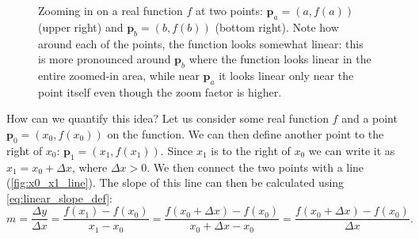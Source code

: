\begin{figure}
  \caption{Zooming in on a real function $f$ at two points: $\bm{p}_{a}=\left(a,f(a)\right)$ (upper right) and $\bm{p}_{b}=\left(b,f(b)\right)$ (bottom right). Note how around each of the points, the function looks somewhat linear: this is more pronounced around $\bm{p}_{b}$ where the function looks linear in the entire zoomed-in area, while near $\bm{p}_{a}$ it looks linear only near the point itself even though the zoom factor is higher.}
  \label{fig:zoom_in}
\end{figure}

How can we quantify this idea? Let us consider some real function $f$ and a point $\bm{p}_{0} = \left(x_{0},f\left(x_{0}\right)\right)$ on the function. We can then define another point to the right of $x_{0}$: $\bm{p}_{1}=\left(x_{1},f\left(x_{1}\right)\right)$. Since $x_{1}$ is to the right of $x_{0}$ we can write it as $x_{1}=x_{0}+\Delta x$, where $\Delta x>0$. We then connect the two points with a line (\autoref{fig:x0_x1_line}). The slope of this line can then be calculated using \autoref{eq:linear_slope_def}:
\begin{equation}
  m = \frac{\Delta y}{\Delta x} = \frac{f\left(x_{1}\right)-f\left(x_{0}\right)}{x_{1}-x_{0}} = \frac{f\left(x_{0}+\Delta x\right)-f\left(x_{0}\right)}{x_{0}+\Delta x - x_{0}} = \frac{f\left(x_{0}+\Delta x\right)-f\left(x_{0}\right)}{\Delta x}.
  \label{eq:derivative_slope_def}
\end{equation}

